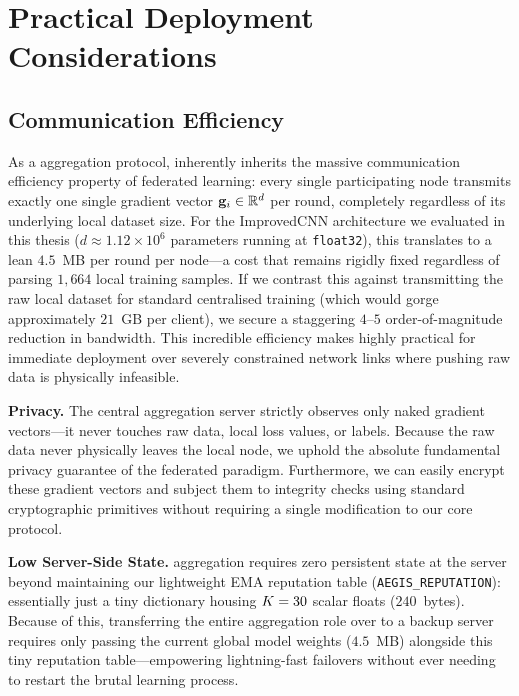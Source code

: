 \documentclass[../main.tex]{subfiles}
\begin{document}
\section{Practical Deployment Considerations}
\label{sec:conclusion_practical}

\subsection{Communication Efficiency}
\label{sec:conclusion_bandwidth}

As a \FL{} aggregation protocol, \aegis{} inherently inherits the massive communication efficiency property of federated learning: every single participating node transmits exactly one single gradient vector $\mathbf{g}_{i} \in \mathbb{R}^d$ per round, completely regardless of its underlying local dataset size. 
For the ImprovedCNN architecture we evaluated in this thesis ($d \approx 1.12 \times 10^6$ parameters running at \texttt{float32}), this translates to a lean $4.5$~MB per round per node---a cost that remains rigidly fixed regardless of parsing $1{,}664$ local training samples. 
If we contrast this against transmitting the raw local dataset for standard centralised training (which would gorge approximately $21$~GB per client), we secure a staggering $4$--$5$ order-of-magnitude reduction in bandwidth. 
This incredible efficiency makes \aegis{} highly practical for immediate deployment over severely constrained network links where pushing raw data is physically infeasible.

\textbf{Privacy.}
The central \aegis{} aggregation server strictly observes only naked gradient vectors---it never touches raw data, local loss values, or labels. 
Because the raw data never physically leaves the local node, we uphold the absolute fundamental privacy guarantee of the federated paradigm. 
Furthermore, we can easily encrypt these gradient vectors and subject them to integrity checks using standard cryptographic primitives without requiring a single modification to our core protocol.

\textbf{Low Server-Side State.}
\aegis{} aggregation requires zero persistent state at the server beyond maintaining our lightweight EMA reputation table (\texttt{AEGIS\_REPUTATION}): essentially just a tiny dictionary housing $K = 30$ scalar floats ($240$~bytes). 
Because of this, transferring the entire aggregation role over to a backup server requires only passing the current global model weights ($4.5$~MB) alongside this tiny reputation table---empowering lightning-fast failovers without ever needing to restart the brutal learning process.
\end{document}

